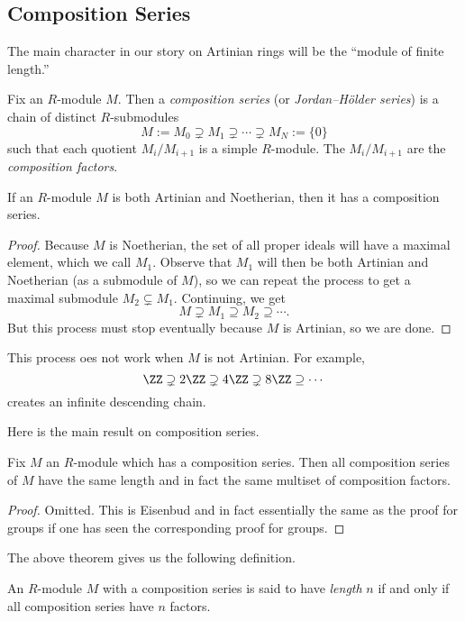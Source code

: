 \subsection{Composition Series}
The main character in our story on Artinian rings will be the ``module of finite length.''
\begin{definition}
	Fix an $R$-module $M$. Then a \textit{composition series} (or \textit{Jordan--H\"older series}) is a chain of distinct $R$-submodules
	\[M:=M_0\supsetneq M_1\supsetneq\cdots\supsetneq M_N:=\{0\}\]
	such that each quotient $M_i/M_{i+1}$ is a simple $R$-module. The $M_i/M_{i+1}$ are the \textit{composition factors}.
\end{definition}
\begin{lemma}
	If an $R$-module $M$ is both Artinian and Noetherian, then it has a composition series.
\end{lemma}
\begin{proof}
	Because $M$ is Noetherian, the set of all proper ideals will have a maximal element, which we call $M_1$. Observe that $M_1$ will then be both Artinian and Noetherian (as a submodule of $M$), so we can repeat the process to get a maximal submodule $M_2\subsetneq M_1$. Continuing, we get
	\[M\supsetneq M_1\supseteq M_2\supseteq\cdots.\]
	But this process must stop eventually because $M$ is Artinian, so we are done.
\end{proof}
\begin{nex}
	This process oes not work when $M$ is not Artinian. For example,
	\[\ZZ\supsetneq2\ZZ\supsetneq4\ZZ\supsetneq 8\ZZ\supseteq\cdots\]
	creates an infinite descending chain.
\end{nex}
Here is the main result on composition series.
\begin{theorem}
	Fix $M$ an $R$-module which has a composition series. Then all composition series of $M$ have the same length and in fact the same multiset of composition factors.
\end{theorem}
\begin{proof}
	Omitted. This is Eisenbud and in fact essentially the same as the proof for groups if one has seen the corresponding proof for groups. %
\end{proof}
The above theorem gives us the following definition.
\begin{defi}[Length]
	An $R$-module $M$ with a composition series is said to have \textit{length} $n$ if and only if all composition series have $n$ factors.
\end{defi}
